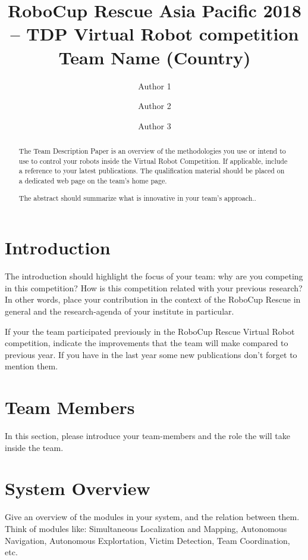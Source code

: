 \documentclass[runningheads,a4paper]{llncs}
\begin{document}
\title{RoboCup Rescue Asia Pacific 2018 -- TDP Virtual Robot competition\\
       Team Name (Country)}
\author{Author 1 \and Author 2 \and Author 3}
\maketitle
\begin{abstract}
The Team Description Paper is an overview of the methodologies you use or intend to use to control your robots inside the Virtual Robot Competition. If applicable, include a reference to your latest publications. The qualification material should be placed on a dedicated web page on the team's home page. 

The abstract should summarize what is innovative in your team's approach..
\end{abstract}
\section{Introduction}
The introduction should highlight the focus of your team: why are you competing in this competition?
How is this competition related with your previous research? In other words, place your contribution
in the context of the RoboCup Rescue in general and the research-agenda of your institute in particular.

If your the team participated previously in the RoboCup Rescue Virtual Robot competition, indicate
the improvements that the team will make compared to previous year. If you have in the last year some 
new publications don't forget to mention them.
\section{Team Members}
In this section, please introduce your team-members and the role the will take inside the team.
\section{System Overview}
Give an overview of the modules in your system, and the relation between them.
Think of modules like: Simultaneous Localization and Mapping, Autonomous Navigation, Autonomous Explortation, Victim Detection, Team Coordination, etc.
\end{document}
